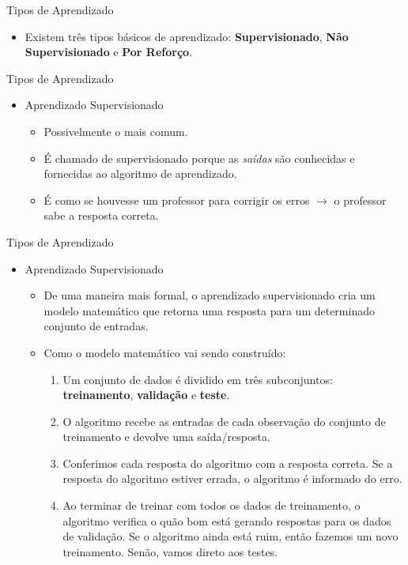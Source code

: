 \documentclass{libs/ufc_format}
\begin{document}
\begin{frame}{Tipos de Aprendizado}
    \begin{itemize}
        \justifying
        \item Existem três tipos básicos de aprendizado: \alert<2>{\textbf{Supervisionado}}, \textbf{Não Supervisionado} e \textbf{Por Reforço}.
    \end{itemize}
\end{frame}

\begin{frame}{Tipos de Aprendizado}
    \begin{itemize}
        \item Aprendizado Supervisionado
            \begin{itemize}
                \justifying
                \item Possivelmente o mais comum.
                \item É chamado de supervisionado porque as \textit{saídas} são conhecidas e fornecidas ao algoritmo de aprendizado.
                \item É como se houvesse um professor para corrigir os erros $\rightarrow$ o professor sabe a resposta correta.
            \end{itemize}
    \end{itemize}
\end{frame}

\begin{frame}{Tipos de Aprendizado}
    \begin{itemize}
        \item Aprendizado Supervisionado
            \begin{itemize}
                \justifying
                \item De uma maneira mais formal, o aprendizado supervisionado cria um modelo matemático que retorna uma resposta para um determinado conjunto de entradas.
                \item Como o modelo matemático vai sendo construído:
                    \begin{enumerate}
                        \justifying
                        \item<2> Um conjunto de dados é dividido em três subconjuntos: \textbf{treinamento}, \textbf{validação} e \textbf{teste}.
                        \item<3> O algoritmo recebe as entradas de cada observação do conjunto de treinamento e devolve uma saída/resposta.
                        \item<4> Conferimos cada resposta do algoritmo com a resposta correta. Se a resposta do algoritmo estiver errada, o algoritmo é informado do erro.
                        \item<5> Ao terminar de treinar com todos os dados de treinamento, o algoritmo verifica o quão bom está gerando respostas para os dados de validação. Se o algoritmo ainda está ruim, então fazemos um novo treinamento. Senão, vamos direto aos testes.
                    \end{enumerate}
            \end{itemize}
    \end{itemize}
\end{frame}
\end{document}
